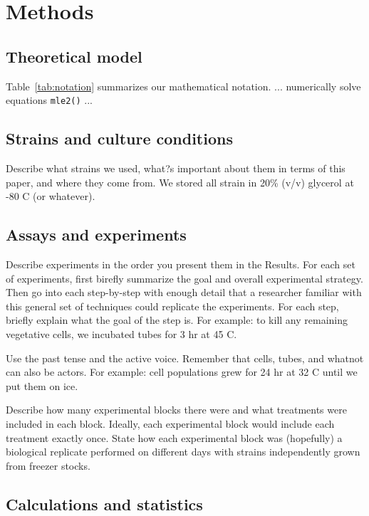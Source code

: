 \documentclass[11pt]{article}
\begin{document}
\clearpage
\section{Methods}

\subsection*{Theoretical model}

Table~\ref{tab:notation} summarizes our mathematical notation. ... numerically solve equations \texttt{mle2()} ... 


\subsection{Strains and culture conditions}

Describe what strains we used, what?s important about them in terms of this paper, and where they come from. We stored all strain in 20\% (v/v) glycerol at -80 C (or whatever).

\subsection{Assays and experiments}

Describe experiments in the order you present them in the Results. For each set of experiments, first birefly summarize the goal and overall experimental strategy. Then go into each step-by-step with enough detail that a researcher familiar with this general set of techniques could replicate the experiments. For each step, briefly explain what the goal of the step is. For example: to kill any remaining vegetative cells, we incubated tubes for 3 hr at 45 C.

Use the past tense and the active voice. Remember that cells, tubes, and whatnot can also be
actors. For example: cell populations grew for 24 hr at 32 C until we put them on ice.

Describe how many experimental blocks there were and what treatments were included in each block. Ideally, each experimental block would include each treatment exactly once. State how each experimental block was (hopefully) a biological replicate performed on different days with strains independently grown from freezer stocks.

\subsection{Calculations and statistics}
\end{document}
